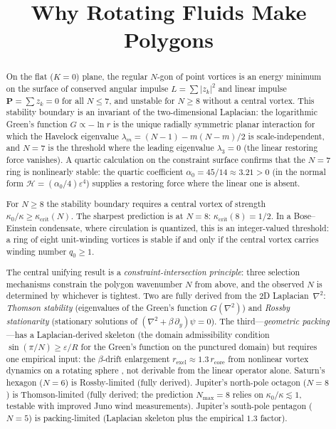 \documentclass[12pt, a4paper]{article}
\title{Why Rotating Fluids Make Polygons}
\author{}
\date{}
\numberwithin{equation}{section}
\begin{document}
\maketitle

\begin{abstract}
On the flat ($K=0$) plane, the regular $N$-gon of point vortices is an
energy minimum on the surface of conserved angular impulse
$L = \sum|z_k|^2$ and linear impulse $\mathbf{P} = \sum z_k = 0$ for
all $N \le 7$, and unstable for $N \ge 8$ without a central vortex.
This stability boundary is an invariant of
the two-dimensional Laplacian: the logarithmic Green's function
$G \propto -\ln r$ is the unique radially symmetric planar interaction
for which the Havelock eigenvalue $\lambda_m = (N-1) - m(N-m)/2$ is
scale-independent, and $N = 7$ is the threshold where the leading
eigenvalue $\lambda_3 = 0$ (the linear restoring force vanishes).
A quartic calculation on the constraint surface confirms that the
$N = 7$ ring is nonlinearly stable: the quartic coefficient
$\alpha_0 = 45/14 \approx 3.21 > 0$ (in the normal form
$\mathcal{H} = (\alpha_0/4)\varepsilon^4$) supplies a restoring force
where the linear one is absent.

For $N \ge 8$ the stability boundary requires a central vortex of
strength $\kappa_0/\kappa \ge \kappa_{\mathrm{crit}}(N)$.  The sharpest
prediction is at $N = 8$: $\kappa_{\mathrm{crit}}(8) = 1/2$.  In a
Bose--Einstein condensate, where circulation is quantized, this is an
integer-valued threshold: a ring of eight unit-winding vortices is
stable if and only if the central vortex carries winding number
$q_0 \ge 1$.

The central unifying result is a \emph{constraint-intersection
principle}: three selection mechanisms constrain the polygon
wavenumber $N$ from above, and the observed $N$ is determined by
whichever is tightest.
Two are fully derived from the 2D Laplacian~$\nabla^2$:
\emph{Thomson stability} (eigenvalues of the Green's function
$G(\nabla^2)$) and \emph{Rossby stationarity} (stationary solutions
of $(\nabla^2 + \beta\,\partial_y)\psi = 0$).
The third---\emph{geometric packing}---has a Laplacian-derived
skeleton (the domain admissibility condition
$\sin(\pi/N) \ge \varepsilon/R$ for the Green's function on the
punctured domain) but requires one empirical input: the
$\beta$-drift enlargement $r_{\mathrm{excl}} \approx
1.3\,r_{\mathrm{core}}$ from nonlinear vortex dynamics on a
rotating sphere \citep{Gavriel2021}, not derivable from the
linear operator alone.
Saturn's hexagon ($N = 6$) is Rossby-limited (fully derived).
Jupiter's north-pole octagon ($N = 8$) is Thomson-limited
(fully derived; the prediction $N_{\max} = 8$ relies on
$\kappa_0/\kappa \lesssim 1$, testable with improved Juno
wind measurements).
Jupiter's south-pole pentagon ($N = 5$) is packing-limited
(Laplacian skeleton plus the empirical $1.3$ factor).


\end{abstract}
\end{document}

